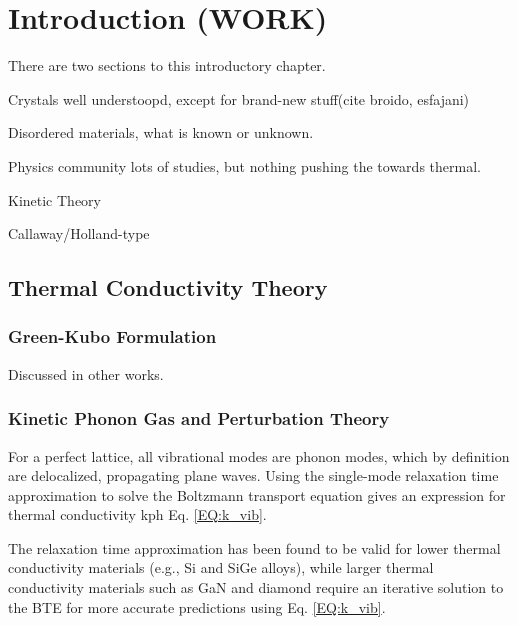 \chapter{Introduction (WORK)}
There are two sections to this introductory chapter.

Crystals well understoopd, except for brand-new stuff(cite broido, 
esfajani)

Disordered materials, what is known or unknown.

Physics community lots of studies, but nothing pushing the towards 
thermal.

Kinetic Theory

Callaway/Holland-type

\section{Thermal Conductivity Theory}

\subsection{Green-Kubo Formulation}

Discussed in other works.



\subsection{Kinetic Phonon Gas and Perturbation Theory}

For a perfect lattice, 
all vibrational modes are phonon modes, which by 
definition are delocalized, propagating plane waves.
\cite{ziman_electrons_2001} Using the single-mode relaxation
time approximation \cite{ziman_electrons_2001} to solve 
the Boltzmann transport equation gives an 
expression for thermal conductivity kph Eq. \ref{EQ:k_vib}. 

The relaxation time approximation has been found to be valid  
for lower thermal conductivity materials 
(e.g., Si and SiGe alloys),
\cite{broido_intrinsic_2007,ward_intrinsic_2010,garg_role_2011} 
while larger thermal conductivity 
materials such as GaN and diamond require an  
iterative solution to the BTE for more accurate predictions 
using Eq. \eqref{EQ:k_vib}.
\cite{ward_ab_2009,lindsay_thermal_2012} 


